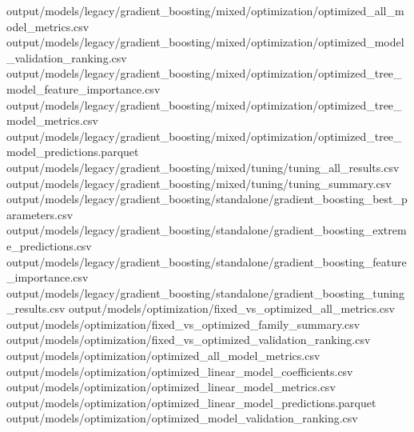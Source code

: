 \documentclass[
  11pt,
  a4paper]{article}
\newenvironment{Shaded}{}{}
\newcommand{\NormalTok}[1]{#1}
\begin{document}
\begin{Shaded}
\begin{Highlighting}[]
\NormalTok{output/models/legacy/gradient\_\allowbreak{}boosting/mixed/optimization/optimized\_\allowbreak{}all\_\allowbreak{}model\_\allowbreak{}metrics.csv}
\NormalTok{output/models/legacy/gradient\_\allowbreak{}boosting/mixed/optimization/optimized\_\allowbreak{}model\_\allowbreak{}validation\_\allowbreak{}ranking.csv}
\NormalTok{output/models/legacy/gradient\_\allowbreak{}boosting/mixed/optimization/optimized\_\allowbreak{}tree\_\allowbreak{}model\_\allowbreak{}feature\_\allowbreak{}importance.csv}
\NormalTok{output/models/legacy/gradient\_\allowbreak{}boosting/mixed/optimization/optimized\_\allowbreak{}tree\_\allowbreak{}model\_\allowbreak{}metrics.csv}
\NormalTok{output/models/legacy/gradient\_\allowbreak{}boosting/mixed/optimization/optimized\_\allowbreak{}tree\_\allowbreak{}model\_\allowbreak{}predictions.parquet}
\NormalTok{output/models/legacy/gradient\_\allowbreak{}boosting/mixed/tuning/tuning\_\allowbreak{}all\_\allowbreak{}results.csv}
\NormalTok{output/models/legacy/gradient\_\allowbreak{}boosting/mixed/tuning/tuning\_\allowbreak{}summary.csv}
\NormalTok{output/models/legacy/gradient\_\allowbreak{}boosting/standalone/gradient\_\allowbreak{}boosting\_\allowbreak{}best\_\allowbreak{}parameters.csv}
\NormalTok{output/models/legacy/gradient\_\allowbreak{}boosting/standalone/gradient\_\allowbreak{}boosting\_\allowbreak{}extreme\_\allowbreak{}predictions.csv}
\NormalTok{output/models/legacy/gradient\_\allowbreak{}boosting/standalone/gradient\_\allowbreak{}boosting\_\allowbreak{}feature\_\allowbreak{}importance.csv}
\NormalTok{output/models/legacy/gradient\_\allowbreak{}boosting/standalone/gradient\_\allowbreak{}boosting\_\allowbreak{}tuning\_\allowbreak{}results.csv}
\NormalTok{output/models/optimization/fixed\_\allowbreak{}vs\_\allowbreak{}optimized\_\allowbreak{}all\_\allowbreak{}metrics.csv}
\NormalTok{output/models/optimization/fixed\_\allowbreak{}vs\_\allowbreak{}optimized\_\allowbreak{}family\_\allowbreak{}summary.csv}
\NormalTok{output/models/optimization/fixed\_\allowbreak{}vs\_\allowbreak{}optimized\_\allowbreak{}validation\_\allowbreak{}ranking.csv}
\NormalTok{output/models/optimization/optimized\_\allowbreak{}all\_\allowbreak{}model\_\allowbreak{}metrics.csv}
\NormalTok{output/models/optimization/optimized\_\allowbreak{}linear\_\allowbreak{}model\_\allowbreak{}coefficients.csv}
\NormalTok{output/models/optimization/optimized\_\allowbreak{}linear\_\allowbreak{}model\_\allowbreak{}metrics.csv}
\NormalTok{output/models/optimization/optimized\_\allowbreak{}linear\_\allowbreak{}model\_\allowbreak{}predictions.parquet}
\NormalTok{output/models/optimization/optimized\_\allowbreak{}model\_\allowbreak{}validation\_\allowbreak{}ranking.csv}

\end{Highlighting}
\end{Shaded}
\end{document}
